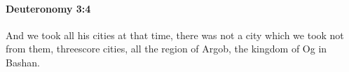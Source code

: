 
		\paragraph{Deuteronomy 3:4} %
			\label{DEUTERONOMY-3-4}

			And we took all his cities at that time, there was not a city which we took not from them, threescore cities, all the region of Argob, the kingdom of Og in Bashan.


